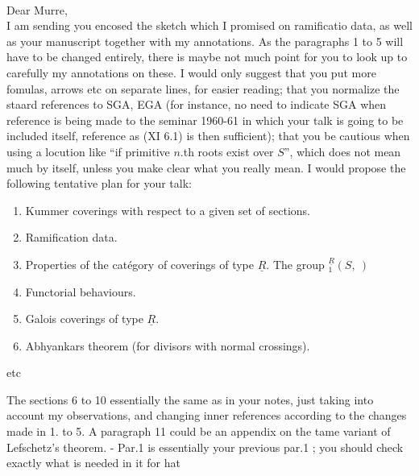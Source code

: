 \\

Dear Murre,\\

I am sending you encosed the sketch which I promised on ramificatio
data, as well as your manuscript together with my annotations. As the paragraphs 1 to 5 will have to be changed entirely, there is maybe not much point for you to look up to carefully my annotations on these.  I would only suggest that you put more fomulas, arrows etc on  separate lines, for easier reading; that you normalize the staard references to SGA, EGA (for instance, no need to indicate SGA when reference is being made to the seminar 1960-61 in which your talk is going to be included itself, reference as (XI 6.1) is then sufficient); that you be cautious when using a locution like ``if primitive $n$.th roots exist over $S$'', which does not mean much by itself, unless you make clear what you really mean. I would propose the following tentative plan for your talk:

\begin{enumerate}[label={}]
\item[1.] Kummer coverings with respect to a given set of sections.
\item[2.] Ramification data.
\reversemarginpar
{}
\normalmarginpar
\item[3.] Properties of the catégory of coverings of type $\underline{R}$. The group ${}_{1}^{\underline{R}}(S,\ )$
\item[4.] Functorial behaviours.
\item[5.] Galois coverings of type $\underline{R}$.
\item[6.] Abhyankars theorem (for divisors with normal crossings).
\end{enumerate}
etc

The sections 6 to 10 essentially the same as in your notes, just taking into account my observations, and changing inner references according to the changes made in 1. to 5. A paragraph 11 could be an appendix on the tame variant of Lefschetz's theorem. - Par.1 is essentially your previous par.1 ; you should check exactly what is needed in it for hat
